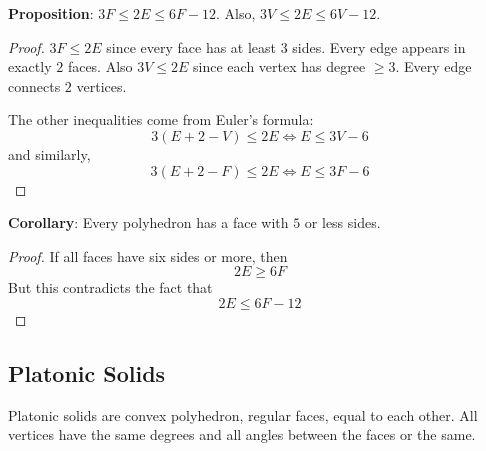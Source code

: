 \documentclass{report}
\begin{document}
\textbf{Proposition}: $3F \leq 2E \leq  6F - 12$. Also, $3V \leq 2E \leq  6V - 12$. 
    \begin{proof}
        $3F \leq 2E$ since every face has at least $3$ sides. Every edge appears in exactly $2$ faces. Also $3V \leq 2E$ since each vertex has degree $\geq 3$. Every edge connects $2$ vertices.

        The other inequalities come from Euler's formula:
            \begin{equation*}
                3(E + 2 - V) \leq 2E \iff E \leq  3V - 6
            \end{equation*}
        and similarly,
            \begin{equation*}
                3(E + 2 - F) \leq 2E \iff E \leq  3F - 6
            \end{equation*}
    \end{proof}

\textbf{Corollary}: Every polyhedron has a face with $5$ or less sides.
    \begin{proof}
        If all faces have six sides or more, then
            \begin{equation*}
                2E \geq 6F
            \end{equation*}
        But this contradicts the fact that 
            \begin{equation*}
                2E \leq 6F - 12
            \end{equation*}
    \end{proof}

\begin{topic}
    \section{Platonic Solids}
\end{topic}

Platonic solids are convex polyhedron, regular faces, equal to each other. All vertices have the same degrees and all angles between the faces or the same.
\end{document}
